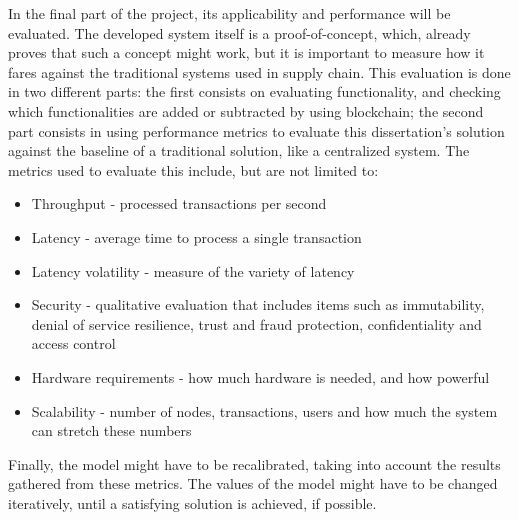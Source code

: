 In the final part of the project, its applicability and performance will be evaluated. The developed system itself is a proof-of-concept, which, already proves that such a concept might work, but it is important to measure how it fares against the traditional systems used in supply chain. This evaluation is done in two different parts: the first consists on evaluating functionality, and checking which functionalities are added or subtracted by using blockchain; the second part consists in using performance metrics to evaluate this dissertation's solution against the baseline of a traditional solution, like a centralized system. The metrics used to evaluate this include, but are not limited to:
\begin{itemize}
\item Throughput - processed transactions per second
\item Latency - average time to process a single transaction
\item Latency volatility - measure of the variety of latency
\item Security - qualitative evaluation that includes items such as immutability, denial of service resilience, trust and fraud protection, confidentiality and access control
\item Hardware requirements - how much hardware is needed, and how powerful
\item Scalability - number of nodes, transactions, users and how much the system can stretch these numbers
\end{itemize}


Finally, the model might have to be recalibrated, taking into account the results gathered from these metrics. The values of the model might have to be changed iteratively, until a satisfying solution is achieved, if possible.



